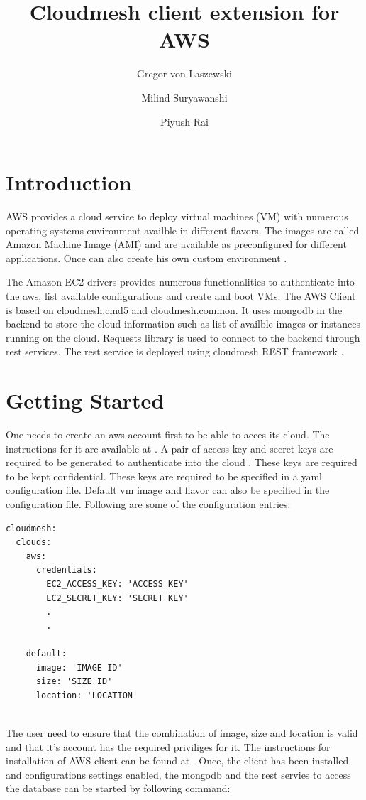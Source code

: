 \documentclass[9pt,twocolumn,twoside]{../../styles/osajnl}
\title{Cloudmesh client extension for AWS}
\author[1]{Gregor von Laszewski}
\author[1]{Milind Suryawanshi}
\author[1]{Piyush Rai}
\affil[1]{School of Informatics and Computing, Bloomington, IN 47408, U.S.A.}
\begin{document}
\maketitle

\section{Introduction}

AWS provides a cloud service to deploy virtual machines (VM) with numerous operating systems environment availble in different flavors. The images are called Amazon Machine Image (AMI) and are available as preconfigured for different applications. Once can also create his own custom environment \cite{www-amazon-ec2}.

The Amazon EC2 drivers provides numerous functionalities to authenticate into the aws, list available configurations and create and boot VMs. The AWS Client is based on cloudmesh.cmd5 and cloudmesh.common. It uses mongodb in the backend to store the cloud information such as list of availble images or instances running on the cloud. Requests library \cite{www-python-requests} is used to connect to the backend through rest services. The rest service is deployed using  cloudmesh REST framework \cite{www-cloudmesh-rest}.

\section{Getting Started}

One needs to create an aws account first to be able to acces its cloud. The instructions for it are available at \cite{www-amazon-aws}. A pair of access key and secret keys are required to be generated to authenticate into the cloud \cite{www-amazon-key}. These keys are required to be kept confidential. These keys are required to be specified in a yaml configuration file. Default vm image and flavor can also be specified in the configuration file. Following are some of the configuration entries:

\begin{verbatim} 
cloudmesh:
  clouds:
    aws:
      credentials:
        EC2_ACCESS_KEY: 'ACCESS KEY'
        EC2_SECRET_KEY: 'SECRET KEY'
        .
        .

    default:
      image: 'IMAGE ID'
      size: 'SIZE ID'
      location: 'LOCATION'
	  
\end{verbatim}

The user need to ensure that the combination of image, size and location is valid and that it's account has the required priviliges for it. The instructions for installation of AWS client can be found at \cite{www-cloudmesh-aws}. Once, the client has been installed and configurations settings enabled, the mongodb and the rest servies to access the database can be started by following command:
\end{document}

